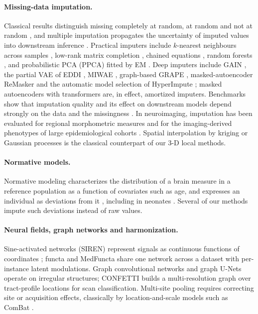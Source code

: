 \documentclass[11pt]{article}
\begin{document}
\paragraph{Missing-data imputation.} Classical results distinguish missing completely at random, at random and not at
random \citep{rubin1976inference,little2019missing}, and multiple imputation propagates the uncertainty of imputed
values into downstream inference \citep{rubin1987multiple}. Practical imputers include $k$-nearest neighbours across
samples \citep{troyanskaya2001knn}, low-rank matrix completion \citep{mazumder2010softimpute}, chained equations
\citep{vanbuuren2011mice}, random forests \citep{stekhoven2012missforest}, and probabilistic PCA (PPCA) fitted by EM
\citep{tipping1999ppca,ilin2010pca}. Deep imputers include GAIN \citep{yoon2018gain}, the partial VAE of EDDI
\citep{ma2019eddi}, MIWAE \citep{mattei2019miwae}, graph-based GRAPE \citep{you2020grape}, masked-autoencoder ReMasker
\citep{du2024remasker} and the automatic model selection of HyperImpute \citep{jarrett2022hyperimpute}; masked
autoencoders \citep{he2022mae} with transformers \citep{vaswani2017attention} are, in effect, amortized imputers.
Benchmarks show that imputation quality and its effect on downstream models depend strongly on the data and the
missingness \citep{garcialaencina2010pattern,jager2021benchmark,shadbahr2023impact}. In neuroimaging, imputation has
been evaluated for regional morphometric measures \citep{stacruz2020imputation} and for the imaging-derived phenotypes
of large epidemiological cohorts \citep{radosavljevic2025generative}. Spatial interpolation by kriging or Gaussian
processes \citep{cressie1993spatial,rasmussen2006gp} is the classical counterpart of our 3-D local methods.

\paragraph{Normative models.} Normative modeling characterizes the distribution of a brain measure in a reference
population as a function of covariates such as age, and expresses an individual as deviations from it
\citep{marquand2016normative,rutherford2022charting,bethlehem2022brainchart}, including in neonates
\citep{omuircheartaigh2020modelling}. Several of our methods impute such deviations instead of raw values.

\paragraph{Neural fields, graph networks and harmonization.} Sine-activated networks (SIREN) represent signals as
continuous functions of coordinates \citep{sitzmann2020siren}; functa \citep{dupont2022functa} and MedFuncta
\citep{friedrich2025medfuncta} share one network across a dataset with per-instance latent modulations. Graph
convolutional networks \citep{kipf2017gcn} and graph U-Nets \citep{gao2019graphunet} operate on irregular structures;
CONFETTI \citep{confetti} builds a multi-resolution graph over tract-profile locations for scan classification.
Multi-site pooling requires correcting site or acquisition effects, classically by location-and-scale models such as
ComBat \citep{johnson2007combat,fortin2017dti}.
\end{document}
